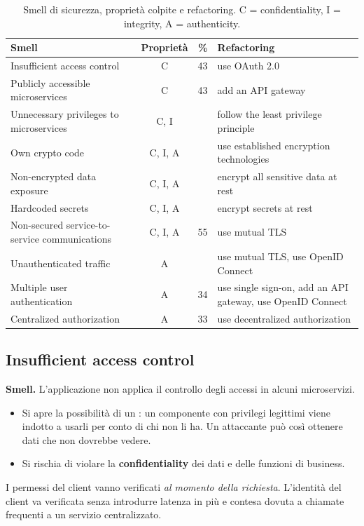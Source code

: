 \begin{table}[ht]
\centering
\small
\caption{Smell di sicurezza, proprietà colpite e refactoring. C = confidentiality, I = integrity, A = authenticity.}
\label{tab:secm-tassonomia}
\begin{tabularx}{\linewidth}{>{\raggedright\arraybackslash}p{4.2cm}cc>{\raggedright\arraybackslash}X}
\toprule
Smell & Proprietà & \% & Refactoring \\
\midrule
Insufficient access control & C & 43 & use OAuth 2.0 \\
Publicly accessible microservices & C & 43 & add an API gateway \\
Unnecessary privileges to microservices & C, I & & follow the least privilege principle \\
Own crypto code & C, I, A & & use established encryption technologies \\
Non-encrypted data exposure & C, I, A & & encrypt all sensitive data at rest \\
Hardcoded secrets & C, I, A & & encrypt secrets at rest \\
Non-secured service-to-service communications & C, I, A & 55 & use mutual TLS \\
Unauthenticated traffic & A & & use mutual TLS, use OpenID Connect \\
Multiple user authentication & A & 34 & use single sign-on, add an API gateway, use OpenID Connect \\
Centralized authorization & A & 33 & use decentralized authorization \\
\bottomrule
\end{tabularx}
\end{table}

\subsection{Insufficient access control}
\label{sec:secm-accesso}

\textbf{Smell.} L'applicazione non applica il controllo degli accessi in alcuni microservizi.
\begin{itemize}
  \item Si apre la possibilità di un : un componente con privilegi legittimi viene
    indotto a usarli per conto di chi non li ha. Un attaccante può così ottenere dati che non dovrebbe vedere.
  \item Si rischia di violare la \textbf{confidentiality} dei dati e delle funzioni di business.
\end{itemize}
I permessi del client vanno verificati \emph{al momento della richiesta}. L'identità del client va verificata senza
introdurre latenza in più e contesa dovuta a chiamate frequenti a un servizio centralizzato.

